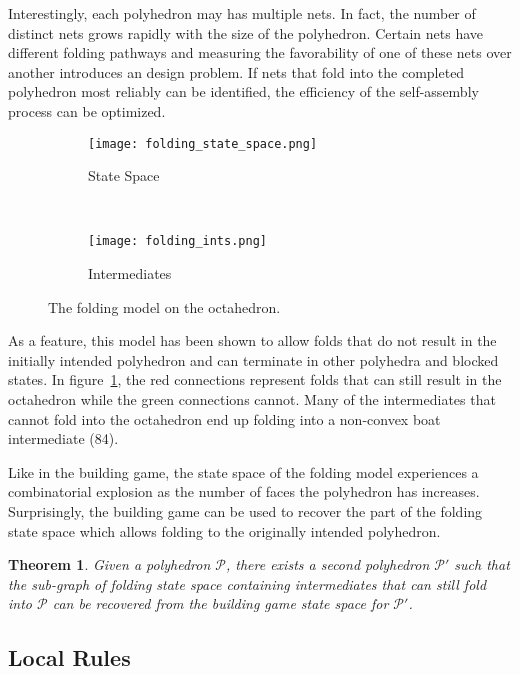 \documentclass[12pt]{article}
\newtheorem{mythm}{Theorem}
\begin{document}
Interestingly, each polyhedron may has multiple nets. In fact, the number of distinct nets grows rapidly with the size of the polyhedron. Certain nets have different folding pathways and measuring the favorability of one of these nets over another introduces an design problem. If nets that fold into the completed polyhedron most reliably can be identified, the efficiency of the self-assembly process can be optimized.

\begin{figure}[h]
\centering
\begin{subfigure}[b]{0.45\textwidth}

\texttt{[image: folding\_state\_space.png]}
\caption{State Space}
\label{fig:fold_ss}

\end{subfigure}
~
\begin{subfigure}[b]{0.4\textwidth}

\texttt{[image: folding\_ints.png]}
\caption{Intermediates}
\label{fig:folding_ints}

\end{subfigure}

\caption{The folding model on the octahedron.}
\label{fig:fold_octa}
\end{figure}

As a feature, this model has been shown to allow folds that do not result in the initially intended polyhedron and can terminate in other polyhedra and blocked states. In figure~\ref{fig:fold_ss}, the red connections represent folds that can still result in the octahedron while the green connections cannot. Many of the intermediates that cannot fold into the octahedron end up folding into a non-convex boat intermediate (84).

Like in the building game, the state space of the folding model experiences a combinatorial explosion as the number of faces the polyhedron has increases. Surprisingly, the building game can be used to recover the part of the folding state space which allows folding to the originally intended polyhedron. 
\begin{mythm}
Given a polyhedron $\mathcal{P}$, there exists a second polyhedron $\mathcal{P}'$ such that the sub-graph of folding state space containing intermediates that can still fold into $\mathcal{P}$ can be recovered from the building game state space for $\mathcal{P}'$.  
\end{mythm}


\subsection{Local Rules}
\end{document}
